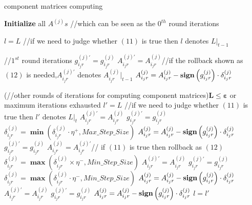\documentclass[11pt]{article}
\begin{document}
\begin{algorithm}  
\caption{component matrices computing}  
\LinesNumbered  
{}  
\textbf{Initialize} all $A^{(j)}s$ //which can be seen as the $0^{th}$ round iterations\;  
  
{$l$\hspace*{-1pt}\textacutedbl}$=L$ //if we need to judge whether $(11)$ is true then {$l$\hspace*{-1pt}\textacutedbl} denotes $L|_{t-1}$\;  
  
{//$1^{st}$ round iterations\;  
    $g_{i_jr}^{(j)'}=g_{i_jr}^{(j)}$\;  
    $A_{i_jr}^{(j)'}=A_{i_jr}^{(j)}$//if the rollback shown as $(12)$ is needed,$A_{i_jr}^{(j)'}$ denotes $A_{i_jr}^{(j)}|_{t-1}$\;  
    $A_{i_jr}^{(j)}=A_{i_jr}^{(j)}-\mathrm{{\bf sign}}\left(g_{i_jr}^{(j)}\right)\cdot\delta_{i_jr}^{(j)}$\;  
}  
  
\Repeat(//other rounds of iterations for computing component matrices){$\bm{L\le \varepsilon}$ or maximum iterations exhausted}  
{  
    $l'=L$ //if we need to judge whether $(11)$ is true then $l'$ denotes $L|_t$\;  
    {  
        {  
                $A_{i_jr}^{(j)'}=A_{i_jr}^{(j)} $\;  
                $g_{i_jr}^{(j)'}=g_{i_jr}^{(j)} $\;  
                $\delta_{i_jr}^{(j)}=\bm{\min}\left(\delta_{i_jr}^{(j)}\cdot\eta^{+},Max\_Step\_Size\right)$\;  
                $A_{i_jr}^{(j)}=A_{i_jr}^{(j)}-\mathrm{{\bf sign}}\left(g_{i_jr}^{(j)}\right)\cdot\delta_{i_jr}^{(j)}$\;  
        }  
        {  
            {  
                $g_{i_jr}^{(j)'}=g_{i_jr}^{(j)}$\;  
                $A_{i_jr}^{(j)}=A_{i_jr}^{(j)'}$// if $(11)$ is true then rollback as $(12)$\;  
                $\delta_{i_jr}^{(j)}=\bm{\max}\left(\delta_{i_jr}^{(j)}\times\eta^{-},Min\_Step\_Size\right)$\;  
            }  
            \Else  
            {  
                $A_{i_jr}^{(j)'}=A_{i_jr}^{(j)} $\;  
                $g_{i_jr}^{(j)'}=g_{i_jr}^{(j)} $\;  
                $\delta_{i_jr}^{(j)}=\bm{\max}\left(\delta_{i_jr}^{(j)}\cdot\eta^{-},Min\_Step\_Size\right)$\;  
                $A_{i_jr}^{(j)}=A_{i_jr}^{(j)}-\mathrm{{\bf sign}}\left(g_{i_jr}^{(j)}\right)\cdot\delta_{i_jr}^{(j)}$\;  
            }  
        }  
        \Else  
        {  
                $A_{i_jr}^{(j)'}=A_{i_jr}^{(j)} $\;  
                $g_{i_jr}^{(j)'}=g_{i_jr}^{(j)} $\;  
                $A_{i_jr}^{(j)}=A_{i_jr}^{(j)}-\mathrm{{\bf sign}}\left(g_{i_jr}^{(j)}\right)\cdot\delta_{i_jr}^{(j)}$\;  
        }  
    }  
    $l$\hspace*{-1pt}\textacutedbl$=l'$\;  
}  
\end{algorithm} 
\end{document}

